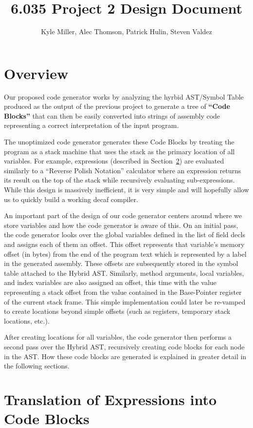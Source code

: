\documentclass[11pt]{article}
\title{6.035 Project 2 Design Document}
\author{Kyle Miller, Alec Thomson, Patrick Hulin, Steven Valdez}
\begin{document}
\maketitle

\section{Overview}

Our proposed code generator works by analyzing the hyrbid AST/Symbol Table produced as the output of the previous project to generate a tree of \textbf{``Code Blocks''} that can then be easily converted into strings of assembly code representing a correct interpretation of the input program. 

The unoptimized code generator generates these Code Blocks by treating the program as a stack machine that uses the stack as the primary location of all variables. For example, expressions (described in Section~\ref{sec:expr}) are evaluated similarly to a ``Reverse Polish Notation'' calculator where an expression returns its result on the top of the stack while recursively  evaluating sub-expressions. While this design is massively inefficient, it is very simple and will hopefully allow us to quickly build a working decaf compiler. 

An important part of the design of our code generator centers around where we store variables and how the code generator is aware of this. On an initial pass, the code generator looks over the global variables defined in the list of field decls and assigns each of them an offset. This offset represents that variable's memory offset (in bytes) from the end of the program text which is represented by a label in the generated assembly. These offsets are subsequently stored in the symbol table attached to the Hybrid AST. Similarly, method arguments, local variables, and index variables are also assigned an offset, this time with the value representing a stack offset from the value contained in the Base-Pointer register of the current stack frame. This simple implementation could later be re-vamped to create locations beyond simple offsets (such as registers, temporary stack locations, etc.). 

After creating locations for all variables, the code generator then performs a second pass over the Hybrid AST, recursively creating code blocks for each node in the AST. How these code blocks are generated is explained in greater detail in the following sections. 

\section {Translation of Expressions into Code Blocks}
\label{sec:expr}
\end{document}
